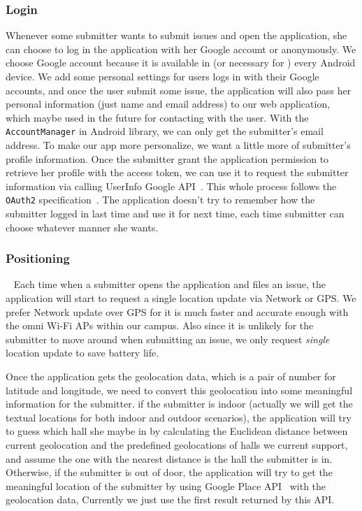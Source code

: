 \documentclass{acm_proc_article-sp}
\begin{document}
 \subsubsection{Login}
 Whenever some submitter wants to submit issues and open the application, she can choose to log in the application with her Google account or anonymously.
 We choose Google account because it is available in (or necessary for ) every Android device. We add some personal settings for users
 logs in with their Google accounts, and once the user submit some issue, the application will also pass her personal information (just name and email address)
 to our web application, which maybe used in the future for contacting with the user. With the \texttt{AccountManager} in Android library, we
 can only get the submitter's email address. To make our app more personalize, we want a little more of submitter's profile information.
 Once the submitter grant the application permission to retrieve her profile with the access token,
 we can use it to request the submitter information via calling UserInfo Google API~\cite{google-user-api}.
 This whole process follows the \texttt{OAuth2} specification~\cite{oauth2}.
 The application doesn't try to remember how the submitter logged in last time and use it for next time,
 each time submitter can choose whatever manner she wants.

\subsubsection{Positioning}~\label{sec:position}
 Each time when a submitter opens the application and files an issue, the application will start to request a single location update via 
 Network or GPS. We prefer Network update over GPS for it is much faster and accurate enough with the omni Wi-Fi APs within our campus.
 Also since it is unlikely for the submitter to move around when submitting an issue, we only request \textit{single} location update 
 to save battery life. \framedots
 
 Once the application gets the geolocation data, which is a pair of number for latitude and longitude, 
 we need to convert this geolocation into some meaningful information for the submitter.
 if the submitter is indoor (actually we will get the textual locations for both indoor and outdoor scenarios), 
 the application will try to guess which hall she maybe in by calculating the Euclidean distance between current geolocation 
 and the predefined geolocations of halls we current support, and assume the one with the nearest distance is the hall the submitter is in. 
 Otherwise, if the submitter is out of door, the application will try to get the meaningful location of the submitter by using 
 Google Place API~\cite{google-place-api} with the geolocation data, Currently we just use the first result returned by this API.
 
\end{document}
